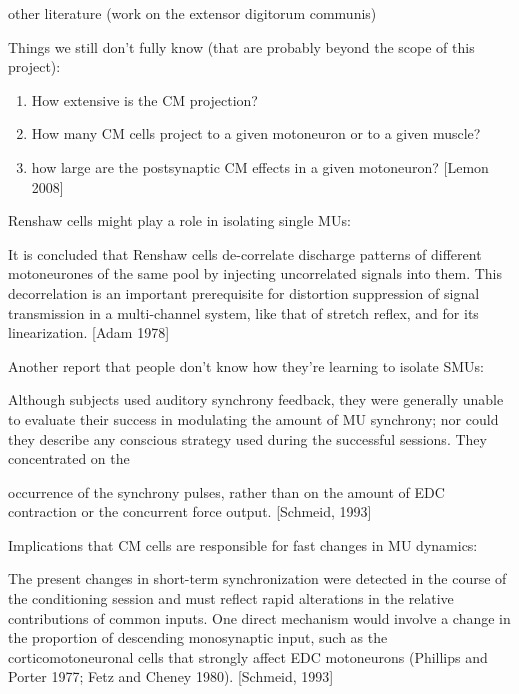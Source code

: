 {            other literature (work on the extensor digitorum communis)

            Things we still don't fully know (that are probably beyond
            the scope of this project):

            \begin{enumerate}
            \def\labelenumi{\arabic{enumi}.}
            \tightlist
            \item
              How extensive is the CM projection?
            \item
              How many CM cells project to a given motoneuron or to a
              given muscle?
            \item
              how large are the postsynaptic CM effects in a given
              motoneuron? {[}Lemon 2008{]}
            \end{enumerate}

            Renshaw cells might play a role in isolating single MUs:

            It is concluded that Renshaw cells de-correlate discharge
            patterns of different motoneurones of the same pool by
            injecting uncorrelated signals into them. This decorrelation
            is an important prerequisite for distortion suppression of
            signal transmission in a multi-channel system, like that of
            stretch reflex, and for its linearization. {[}Adam 1978{]}

            Another report that people don't know how they're learning
            to isolate SMUs:

            Although subjects used auditory synchrony feedback, they
            were generally unable to evaluate their success in
            modulating the amount of MU synchrony; nor could they
            describe any conscious strategy used during the successful
            sessions. They concentrated on the

            occurrence of the synchrony pulses, rather than on the
            amount of EDC contraction or the concurrent force output.
            {[}Schmeid, 1993{]}

            Implications that CM cells are responsible for fast changes
            in MU dynamics:

            The present changes in short-term synchronization were
            detected in the course of the conditioning session and must
            reflect rapid alterations in the relative contributions of
            common inputs. One direct mechanism would involve a change
            in the proportion of descending monosynaptic input, such as
            the corticomotoneuronal cells that strongly affect EDC
            motoneurons (Phillips and Porter 1977; Fetz and Cheney
            1980). {[}Schmeid, 1993{]}

}
